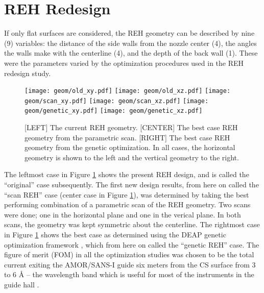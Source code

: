 \documentclass[a4paper]{jpconf}
\begin{document}
\section{REH Redesign}

If only flat surfaces are considered, the REH geometry can be described by nine (9) variables:  the distance of the side walls from the nozzle center (4), the angles the walls make with the centerline (4), and the depth of the back wall (1).  These were the parameters varied by the optimization procedures used in the REH redesign study.

\begin{figure}[h!]
\begin{center}
\texttt{[image: geom/old\_xy.pdf]}    
\texttt{[image: geom/old\_xz.pdf]}
\quad
\texttt{[image: geom/scan\_xy.pdf]}     
\texttt{[image: geom/scan\_xz.pdf]}
\quad
\texttt{[image: geom/genetic\_xy.pdf]} 
\texttt{[image: geom/genetic\_xz.pdf]} 
\caption{\label{geom_cases} [LEFT] The current REH geometry. [CENTER] The best case REH geometry from the parametric scan. [RIGHT] The best case REH geometry from the genetic optimization.  In all cases, the horizontal geometry is shown to the left and the vertical geometry to the right.}
\end{center}
\end{figure}

The leftmost case in Figure \ref{geom_cases} shows the present REH design, and is called the ``original'' case subsequently.  The first new design results, from here on called the ``scan REH'' case (center case in Figure \ref{geom_cases}), was determined by taking the best performing combination of a parametric scan of the REH geometry. Two scans were done; one in the horizontal plane and one in the verical plane. In both scans, the geometry was kept symmetric about the centerline.  The rightmost case in Figure \ref{geom_cases} shows the best case as determined using the DEAP genetic optimization framework \cite{deap}, which from here on called the ``genetic REH'' case.  The figure of merit (FOM) in all the optimization studies was chosen to be the total current exiting the AMOR/SANS-I guide six meters from the CS surface from 3 to 6 \AA{} -- the wavelength band which is useful for most of the instruments in the guide hall \cite{instruments_wavelength}. %
\end{document}
